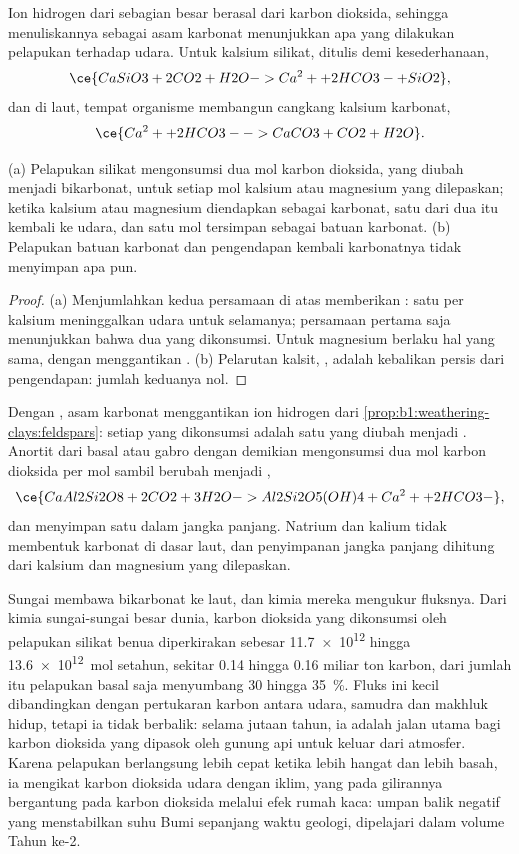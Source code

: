 Ion hidrogen dari  sebagian besar berasal dari karbon dioksida, sehingga menuliskannya sebagai asam karbonat menunjukkan apa yang dilakukan pelapukan terhadap udara. Untuk kalsium silikat, ditulis  demi kesederhanaan,
\[
  \ce{CaSiO3 + 2 CO2 + H2O -> Ca^2+ + 2 HCO3- + SiO2},
\]
dan di laut, tempat organisme membangun cangkang kalsium karbonat,
\[
  \ce{Ca^2+ + 2 HCO3- -> CaCO3 + CO2 + H2O}.
\]

\begin{proposition}\label{prop:b1:weathering-clays:co2}
(a) Pelapukan silikat mengonsumsi dua mol karbon dioksida, yang diubah menjadi bikarbonat, untuk setiap mol kalsium atau magnesium yang dilepaskan; ketika kalsium atau magnesium diendapkan sebagai karbonat, satu dari dua itu kembali ke udara, dan satu mol tersimpan sebagai batuan karbonat. (b) Pelapukan batuan karbonat dan pengendapan kembali karbonatnya tidak menyimpan apa pun.
\end{proposition}

\begin{proof}
(a) Menjumlahkan kedua persamaan di atas memberikan :
satu  per kalsium meninggalkan udara untuk selamanya; persamaan pertama saja menunjukkan bahwa dua yang dikonsumsi. Untuk magnesium berlaku hal yang sama, dengan  menggantikan . (b) Pelarutan kalsit, , adalah kebalikan persis dari pengendapan: jumlah keduanya nol.
\end{proof}

Dengan , asam karbonat menggantikan ion hidrogen dari \cref{prop:b1:weathering-clays:feldspars}: setiap  yang dikonsumsi adalah satu  yang diubah menjadi . Anortit dari basal atau gabro dengan demikian mengonsumsi dua mol karbon dioksida per mol sambil berubah menjadi ,
\[
  \ce{CaAl2Si2O8 + 2 CO2 + 3 H2O -> Al2Si2O5(OH)4 + Ca^2+ + 2 HCO3-},
\]
dan menyimpan satu dalam jangka panjang. Natrium dan kalium tidak membentuk karbonat di dasar laut, dan penyimpanan jangka panjang dihitung dari kalsium dan magnesium yang dilepaskan.

Sungai membawa bikarbonat ke laut, dan kimia mereka mengukur fluksnya. Dari kimia sungai-sungai besar dunia, karbon dioksida yang dikonsumsi oleh pelapukan silikat benua diperkirakan sebesar \num{11.7e12} hingga \qty{13.6e12}{mol} setahun, sekitar 0.14 hingga 0.16 miliar ton karbon, dari jumlah itu
pelapukan basal saja menyumbang 30 hingga \qty{35}{\percent}. Fluks ini kecil dibandingkan dengan pertukaran karbon antara udara, samudra dan makhluk hidup, tetapi ia tidak berbalik: selama jutaan tahun, ia adalah jalan utama bagi karbon dioksida yang dipasok oleh gunung api untuk keluar dari atmosfer. Karena pelapukan berlangsung lebih cepat ketika lebih hangat dan lebih basah, ia mengikat karbon dioksida udara dengan iklim, yang pada gilirannya bergantung pada karbon dioksida melalui efek rumah kaca: umpan balik negatif yang menstabilkan suhu Bumi sepanjang waktu geologi, dipelajari dalam volume Tahun ke-2.

